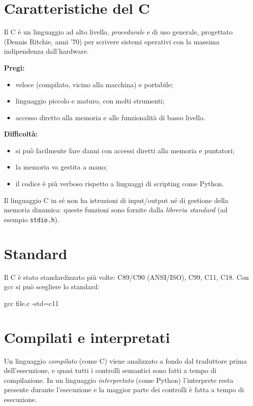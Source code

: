 \documentclass[11pt,a4paper]{article}
\begin{document}
\section{Caratteristiche del C}

Il C è un linguaggio ad alto livello, \emph{procedurale} e di uso generale,
progettato (Dennis Ritchie, anni '70) per scrivere sistemi operativi con la
massima indipendenza dall'hardware.

\textbf{Pregi:}
\begin{itemize}
    \item veloce (compilato, vicino alla macchina) e portabile;
    \item linguaggio piccolo e maturo, con molti strumenti;
    \item accesso diretto alla memoria e alle funzionalità di basso livello.
\end{itemize}

\textbf{Difficoltà:}
\begin{itemize}
    \item si può facilmente fare danni con accessi diretti alla memoria e
          puntatori;
    \item la memoria va gestita a mano;
    \item il codice è più verboso rispetto a linguaggi di scripting come Python.
\end{itemize}

\begin{osservazione}
Il linguaggio C in sé non ha istruzioni di input/output né di gestione della
memoria dinamica: queste funzioni sono fornite dalla \emph{libreria standard}
(ad esempio \lstinline|stdio.h|).
\end{osservazione}

\section{Standard}

Il C è stato standardizzato più volte: C89/C90 (ANSI/ISO), C99, C11, C18. Con
gcc si può scegliere lo standard:
\begin{comando}
gcc file.c -std=c11
\end{comando}

\section{Compilati e interpretati}

Un linguaggio \emph{compilato} (come C) viene analizzato a fondo dal traduttore
prima dell'esecuzione, e quasi tutti i controlli semantici sono fatti a tempo di
compilazione. In un linguaggio \emph{interpretato} (come Python) l'interprete
resta presente durante l'esecuzione e la maggior parte dei controlli è fatta a
tempo di esecuzione.
\end{document}
